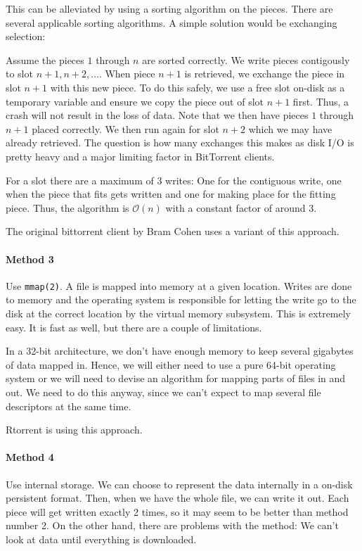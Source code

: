 \documentclass[a4paper]{report}
\begin{document}
This can be alleviated by using a sorting algorithm on the
pieces. There are several applicable sorting algorithms. A simple
solution would be exchanging selection:

Assume the pieces $1$ through $n$ are sorted correctly. We write
pieces contigously to slot $n+1, n+2, \dotsc$. When piece $n+1$ is
retrieved, we exchange the piece in slot $n+1$ with this new piece. To
do this safely, we use a free slot on-disk as a temporary variable and
ensure we copy the piece out of slot $n+1$ first. Thus, a crash will
not result in the loss of data. Note that we then have pieces $1$
through $n+1$ placed correctly. We then run again for slot $n+2$ which
we may have already retrieved. The question is how many exchanges this
makes as disk I/O is pretty heavy and a major limiting factor in
BitTorrent clients.

For a slot there are a maximum of 3 writes: One for the contiguous
write, one when the piece that fits gets written and one for making
place for the fitting piece. Thus, the algorithm is $\mathcal{O}(n)$
with a constant factor of around 3.

The original bittorrent client by Bram Cohen uses a variant of this
approach.

\paragraph{Method 3}
Use \texttt{mmap(2)}. A file is mapped into memory at a given
location. Writes are done to memory and the operating system is
responsible for letting the write go to the disk at the correct
location by the virtual memory subsystem. This is extremely easy. It
is fast as well, but there are a couple of limitations.

In a 32-bit architecture, we don't have enough memory to keep
several gigabytes of data mapped in. Hence, we will either need to use
a pure 64-bit operating system or we will need to devise an algorithm
for mapping parts of files in and out. We need to do this anyway,
since we can't expect to map several file descriptors at the same
time.

Rtorrent is using this approach.

\paragraph{Method 4}
Use internal storage. We can choose to represent the data internally
in a on-disk persistent format. Then, when we have the whole file, we
can write it out. Each piece will get written exactly 2 times, so it
may seem to be better than method number 2. On the other hand, there
are problems with the method: We can't look at data until everything
is downloaded.
\end{document}

